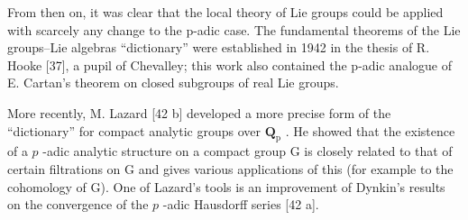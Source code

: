 From then on, it was clear that the local theory of Lie groups could be applied with scarcely any change to the p-adic case. The fundamental theorems of the Lie groups--Lie algebras ``dictionary'' were established in 1942 in the thesis of R. Hooke {[}37{]}, a pupil of Chevalley; this work also contained the p-adic analogue of E. Cartan's theorem on closed subgroups of real Lie groups.

More recently, M. Lazard {[}42 b{]} developed a more precise form of the ``dictionary'' for compact analytic groups over \(\mathbf{Q}_{\mathrm{p}}\) . He showed that the existence of a \(p\) -adic analytic structure on a compact group G is closely related to that of certain filtrations on G and gives various applications of this (for example to the cohomology of G). One of Lazard's tools is an improvement of Dynkin's results on the convergence of the \(p\) -adic Hausdorff series {[}42 a{]}.

